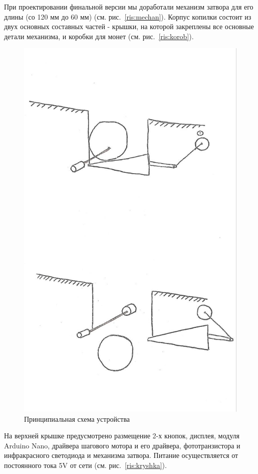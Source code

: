 При проектировании финальной версии мы доработали механизм затвора для его длины (со 120 мм до 60 мм) (см. рис.~\ref{ris:mechan}).
Корпус копилки состоит из двух основных составных частей - крышки, на которой закреплены все основные детали механизма, и коробки для монет (см. рис.~\ref{ris:korob}). 

\begin{figure}[H]
	\centering
	\includegraphics[width=12cm]{scheme_idea.jpg}
	\caption{Принципиальная схема устройства}
	\label{ris:scheme_idea}
\end{figure}
\par\medskip

На верхней крышке предусмотрено размещение 2-х кнопок, дисплея, модуля Arduino Nano, драйвера шагового мотора и его драйвера, фототранзистора и инфракрасного светодиода и механизма затвора. Питание осуществляется от постоянного тока 5V от сети (см. рис.~\ref{ris:kryshka}).  

